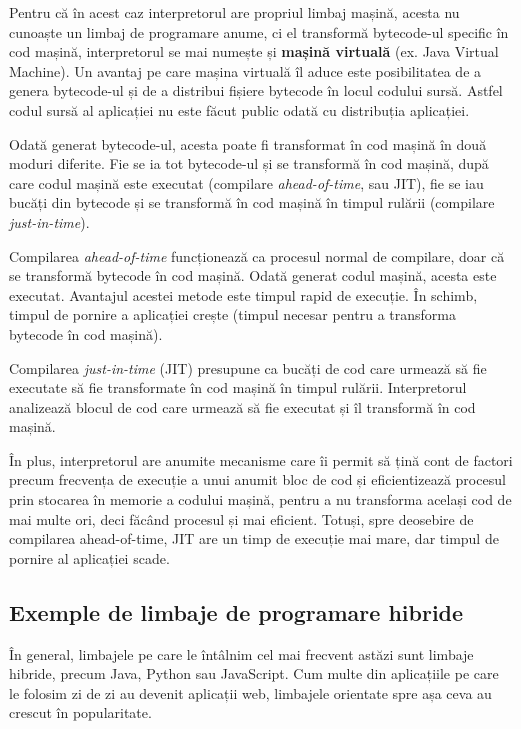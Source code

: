 Pentru că în acest caz interpretorul are propriul limbaj mașină, acesta nu cunoaște
un limbaj de programare anume, ci el transformă bytecode-ul specific în cod
mașină, interpretorul se mai numește și \textbf{mașină virtuală} (ex. Java Virtual
Machine). Un avantaj pe care mașina virtuală îl aduce este posibilitatea de a
genera bytecode-ul și de a distribui fișiere bytecode în locul codului sursă.
Astfel codul sursă al aplicației nu este făcut public odată cu distribuția
aplicației.

Odată generat bytecode-ul, acesta poate fi transformat în cod mașină în două
moduri diferite. Fie se ia tot bytecode-ul și se transformă în cod mașină, după
care codul mașină este executat (compilare \textit{ahead-of-time}, sau JIT), fie se iau bucăți din
bytecode și se transformă în cod mașină în timpul rulării (compilare
\textit{just-in-time}).

Compilarea \textit{ahead-of-time} funcționează ca procesul normal de compilare, doar că
se transformă bytecode în cod mașină. Odată generat codul mașină, acesta este
executat. Avantajul acestei metode este timpul rapid de execuție. În schimb,
timpul de pornire a aplicației crește (timpul necesar pentru a transforma
bytecode în cod mașină).

Compilarea \textit{just-in-time} (JIT) presupune ca bucăți de cod care urmează să fie executate
să fie transformate în cod mașină în timpul rulării. Interpretorul analizează
blocul de cod care urmează să fie executat și îl transformă în cod mașină.

În plus, interpretorul are anumite mecanisme care îi permit să țină cont de
factori precum frecvența de execuție a unui anumit bloc de cod și eficientizează
procesul prin stocarea în memorie a codului mașină, pentru a nu transforma
același cod de mai multe ori, deci făcând procesul și mai eficient. Totuși, spre
deosebire de compilarea ahead-of-time, JIT are un
timp de execuție mai mare, dar timpul de pornire al aplicației scade.

\subsection{Exemple de limbaje de programare hibride}
\label{sec:appdev:hybrid-lang:ex}

În general, limbajele pe care le întâlnim cel mai frecvent astăzi sunt limbaje
hibride, precum Java, Python sau JavaScript. Cum multe din aplicațiile pe care
le folosim zi de zi au devenit aplicații web, limbajele orientate spre așa ceva
au crescut în popularitate.

